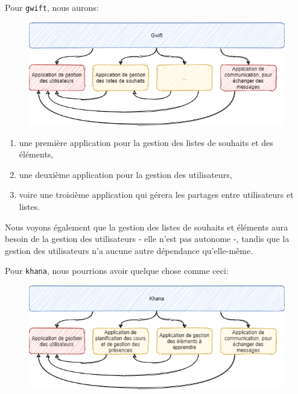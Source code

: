 \documentclass[11pt]{amsbook}
\begin{document}
Pour \texttt{gwift}, nous aurons:


\begin{figure}[h]{}
\centering\includegraphics[width=2.5truein]{images/django/django-project-vs-apps-gwift.png}
\caption{}

\end{figure}

\begin{enumerate}

\item{une première application pour la gestion des listes de souhaits et des éléments,}

\item{une deuxième application pour la gestion des utilisateurs,}

\item{voire une troisième application qui gérera les partages entre utilisateurs et listes.}

\end{enumerate}


Nous voyons également que la gestion des listes de souhaits et éléments aura besoin de la gestion des utilisateurs - elle n’est pas autonome -, tandis que la gestion des utilisateurs n’a aucune autre dépendance qu’elle-même.


Pour \texttt{khana}, nous pourrions avoir quelque chose comme ceci:


\begin{figure}[h]{}
\centering\includegraphics[width=2.5truein]{images/django/django-project-vs-apps-khana.png}
\caption{}

\end{figure}
\end{document}
